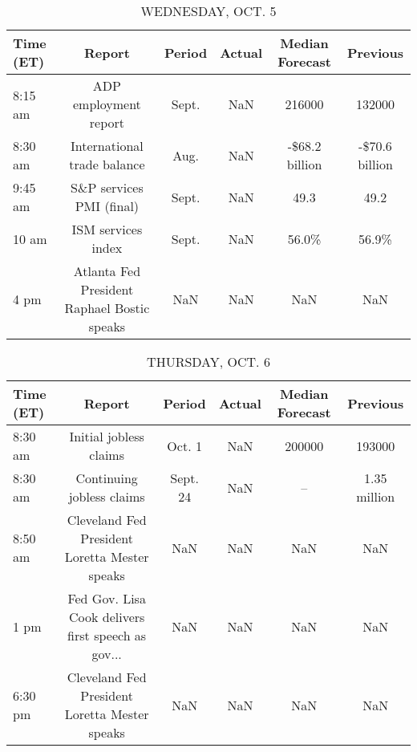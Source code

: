 \documentclass{article}%
\begin{document}
%


\begin{table}[htbp]%
\caption{WEDNESDAY, OCT. 5}%
\centering%
\begin{adjustbox}{width=1\textwidth}%
\begin{tabular}{lccccc}
\toprule
Time (ET) &                                      Report & Period & Actual & Median Forecast &       Previous \\
\midrule
  8:15 am &                       ADP employment report &  Sept. &    NaN &          216000 &         132000 \\
  8:30 am &                 International trade balance &   Aug. &    NaN &  -\$68.2 billion & -\$70.6 billion \\
  9:45 am &                    S\&P services PMI (final) &  Sept. &    NaN &            49.3 &           49.2 \\
    10 am &                          ISM services index &  Sept. &    NaN &           56.0\% &          56.9\% \\
     4 pm & Atlanta Fed President Raphael Bostic speaks &    NaN &    NaN &             NaN &            NaN \\
\bottomrule
\end{tabular}
%
\end{adjustbox}%
\end{table}

%


\begin{table}[htbp]%
\caption{THURSDAY, OCT. 6}%
\centering%
\begin{adjustbox}{width=1\textwidth}%
\begin{tabular}{lccccc}
\toprule
Time (ET) &                                             Report &   Period & Actual & Median Forecast &     Previous \\
\midrule
  8:30 am &                             Initial jobless claims &   Oct. 1 &    NaN &          200000 &       193000 \\
  8:30 am &                          Continuing jobless claims & Sept. 24 &    NaN &              -- & 1.35 million \\
  8:50 am &      Cleveland Fed President Loretta Mester speaks &      NaN &    NaN &             NaN &          NaN \\
     1 pm & Fed Gov. Lisa Cook delivers first speech as gov... &      NaN &    NaN &             NaN &          NaN \\
  6:30 pm &      Cleveland Fed President Loretta Mester speaks &      NaN &    NaN &             NaN &          NaN \\
\bottomrule
\end{tabular}
%
\end{adjustbox}%
\end{table}
\end{document}
